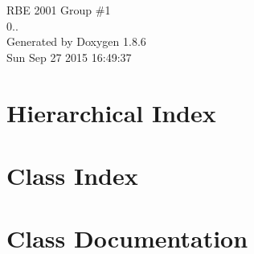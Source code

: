 \documentclass[twoside]{book}
\newcommand{\clearemptydoublepage}{%
  \newpage{\pagestyle{empty}\cleardoublepage}%
}
\begin{document}
\hypersetup{pageanchor=false}
\begin{titlepage}
\vspace*{7cm}
\begin{center}%
{\Large R\-B\-E 2001 Group \#1 \\[1ex]\large 0.. }\\
\vspace*{1cm}
{\large Generated by Doxygen 1.8.6}\\
\vspace*{0.5cm}
{\small Sun Sep 27 2015 16:49:37}\\
\end{center}
\end{titlepage}
\clearemptydoublepage
\tableofcontents
\clearemptydoublepage
{}
\hypersetup{pageanchor=true}

\chapter{Hierarchical Index}

\chapter{Class Index}

\chapter{Class Documentation}




































\newpage
{}
{}
\printindex
\end{document}
